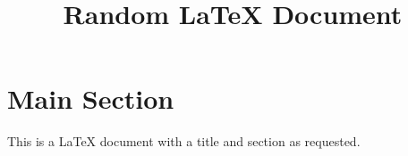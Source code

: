 \documentclass{article}
\title{Random LaTeX Document}
\author{}
\date{}
\begin{document}
\maketitle

\section{Main Section}

This is a LaTeX document with a title and section as requested.
\end{document}
